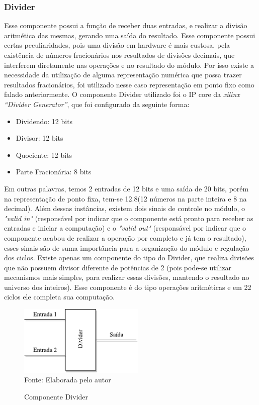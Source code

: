 \subsubsection{Divider}
Esse componente possui a função de receber duas entradas, e realizar a divisão aritmética das mesmas, gerando uma saída do resultado. Esse componente possui certas peculiaridades, pois uma divisão em hardware é mais custosa, pela existência de números fracionários nos resultados de divisões decimais, que interferem diretamente nas operações e no resultado do módulo. Por isso existe a necessidade da utilização de alguma representação numérica que possa trazer resultados fracionários, foi utilizado nesse caso representação em ponto fixo como falado anteriormente. O componente Divider utilizado foi o IP core da \textit{xilinx “Divider Generator”}, que foi configurado da seguinte forma: 
\begin{itemize}
	\item 	Dividendo: 12 bits
	\item 	Divisor: 12 bits
	\item 	Quociente: 12 bits
	\item 	Parte Fracionária: 8 bits
\end{itemize}
Em outras palavras, temos 2 entradas de 12 bits e uma saída de 20 bits, porém na representação de ponto fixa, tem-se 12.8(12 números na parte inteira e 8 na decimal). Além dessas instâncias, existem dois sinais de controle no módulo, o \textit{"valid in"} (responsável por indicar que o componente está pronto para receber as entradas e iniciar a computação) e o \textit{"valid out"} (responsável por indicar que o componente acabou de realizar a operação por completo e já tem o resultado), esses sinais são de suma importância para a organização do módulo e regulação dos ciclos. Existe apenas um componente do tipo do Divider, que realiza divisões que não possuem divisor diferente de potências de 2 (pois pode-se utilizar mecanismos mais simples, para realizar essas divisões, mantendo o resultado no universo dos inteiros).  Esse componente é do tipo operações aritméticas e em 22 ciclos ele completa sua computação.

\begin{figure}[H]
	\centering
	\caption{Componente Divider}
	\includegraphics[width=6cm]{figures/Divider.pdf}\\
	
		{Fonte: Elaborada pelo autor}
	\label{divider}
\end{figure}

